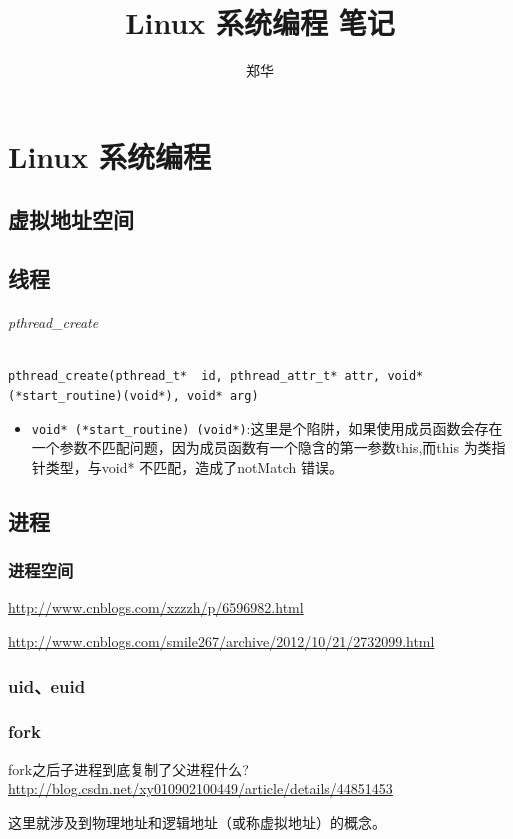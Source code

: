 \documentclass[UTF8,a4paper,12pt]{ctexbook}
\author{\kaishu 郑华}
\title{Linux 系统编程 笔记}
\begin{document}
 	\maketitle
  
\chapter{Linux 系统编程}
	\section{虚拟地址空间}
		
	
	\section{线程}
		\subparagraph{pthread\_create}

		\verb|pthread_create(pthread_t*  id, pthread_attr_t* attr, void*(*start_routine)(void*), void* arg)|
		
		\begin{itemize}
			\item \verb|void* (*start_routine) (void*)|:这里是个陷阱，如果使用成员函数会存在一个参数不匹配问题，因为成员函数有一个隐含的第一参数this,而this 为类指针类型，与void* 不匹配，造成了notMatch 错误。
		\end{itemize}
				 
	\section{进程}
		\subsection{进程空间}
			\url{http://www.cnblogs.com/xzzzh/p/6596982.html}
			
			\url{http://www.cnblogs.com/smile267/archive/2012/10/21/2732099.html}
		\subsection{uid、euid}
		
		\subsection{fork}
			fork之后子进程到底复制了父进程什么? \url{http://blog.csdn.net/xy010902100449/article/details/44851453}
			
			
			这里就涉及到物理地址和逻辑地址（或称虚拟地址）的概念。
			
\end{document}
